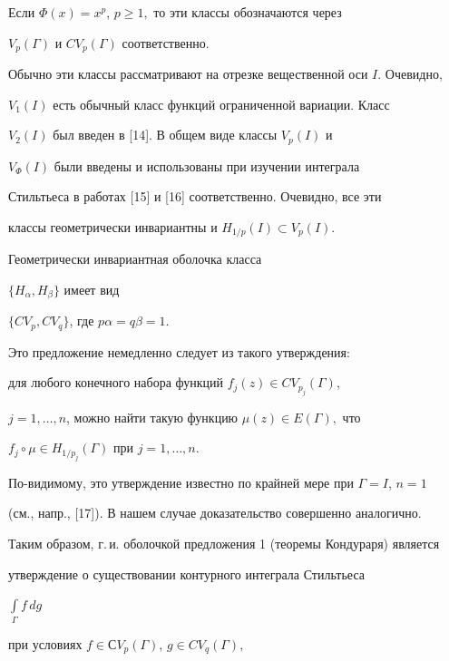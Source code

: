 Если $\Phi (x) = x^p$, $p\ge 1,$ то эти классы обозначаются через


$V_{p}(\Gamma)$ и $CV_{p}(\Gamma)$ соответственно.


Обычно эти классы рассматривают на отрезке вещественной оси $I$. Очевидно,


$V_{1}(I)$ есть обычный класс функций ограниченной вариации. Класс


$V_{2}(I)$ был введен в [14]. В общем виде классы $V_{p}(I)$ и


$V_{\Phi}(I)$ были введены и использованы при изучении интеграла


Стильтьеса в работах [15] и [16] соответственно. Очевидно, все эти


классы геометрически инвариантны и $H_{1/p}(I)\subset V_{p}(I).$





\begin{prop} Геометрически инвариантная оболочка класса


$\{H_{\alpha}, H_{\beta}\}$ имеет вид\linebreak


$\{CV_{p}, CV_{q}\}$, где $p\alpha =


q\beta = 1$.


\end{prop}





Это предложение немедленно следует из такого утверждения:


для любого конечного набора функций $f_{j}(z)\in CV_{p_j}(\Gamma)$,


$j=1,\dotsc,n$, можно найти такую функцию $\mu (z)\in E(\Gamma),$ что


$f_{j}\circ\mu\in H_{1/p_j}(\Gamma)$ при $j =1,\dotsc,n.$


По-видимому, это утверждение известно по крайней мере при $\Gamma=I$, $n=1$


(см., напр., [17]). В нашем случае доказательство совершенно аналогично.





Таким образом, г.\,и. оболочкой предложения 1 (теоремы Кондураря) является


утверждение о существовании контурного интеграла Стильтьеса


$\int\limits_{\Gamma}f\,dg$


при условиях $f\in СV_{p}(\Gamma)$, $g\in CV_{q}(\Gamma)$,



